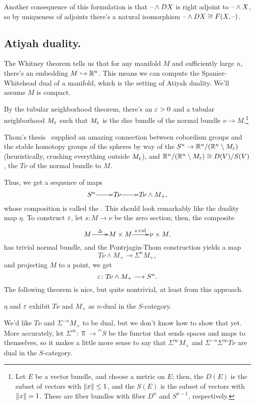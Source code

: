 Another consequence of this formulation is that $\text{--}\wedge DX$ is right adjoint to $\text{--}\wedge X$, so by uniqueness
of adjoints there's a natural isomorphism $\text{--}\wedge DX\cong F(X,\text{--})$.
\subsection*{Atiyah duality.}
The Whitney theorem tells us that for any manifold $M$ and sufficiently large $n$, there's an embedding
$M\hookrightarrow\mathbb R^n$. This means we can compute the Spanier-Whitehead dual of a manifold, which is the setting of Atiyah
duality. We'll assume $M$ is compact.

By the tubular neighborhood theorem, there's an $\varepsilon > 0$ and a tubular neighborhood $M_\varepsilon$ such that $M_\varepsilon$ is the
disc bundle of the normal bundle $\nu\to M$.\footnote{Let $E$ be a vector bundle, and choose a metric on $E$; then,
the  $D(E)$ is the subset of vectors with $\lVert x\rVert\le 1$, and the  $S(E)$ is
the subset of vectors with $\lVert x\rVert = 1$. These are fiber bundles with fiber $D^n$ and $S^{n-1}$, respectively.}

Thom's thesis~\cite{ThomThesis} supplied an amazing connection between cobordism groups and the stable homotopy
groups of the spheres by way of the  $S^n\to \mathbb R^n/(\mathbb R^n\setminus M_\varepsilon)$ (heuristically,
crushing everything outside $M_\varepsilon$), and $\mathbb R^n/(\mathbb R^n\setminus M_\varepsilon)\cong D(V)/S(V)$, the  $T\!\nu$
of the normal bundle to $M$.

Thus, we get a sequence of maps
\[\xymatrix@1{
	S^n\ar[r] & T\!\nu\ar[r] & T\!\nu\wedge M_+,
}\]
whose composition is called the . This should look remarkably like the duality map $\eta$. To
construct $\varepsilon$, let $s\colon M\to\nu$ be the zero section; then, the composite
\[\xymatrix@1{
	M\ar[r]^-\Delta & M\times M\ar[r]^{s\times\id} &\nu\times M.
}\]
has trivial normal bundle, and the Pontrjagin-Thom construction yields a map
\[T\!\nu\wedge M_+\longrightarrow\Sigma^n M_+,\]
and projecting $M$ to a point, we get
\[\varepsilon\colon T\!\nu\wedge M_+\longrightarrow S^n.\]
The following theorem is nice, but quite nontrivial, at least from this approach.
\begin{thm}
\label{atiyah_duality}
$\eta$ and $\varepsilon$ exhibit $T\!\nu$ and $M_+$ as $n$-dual in the $S$-category.
\end{thm}
We'd like $T\!\nu$ and $\Sigma^{-n}M_+$ to be dual, but we don't know how to show that yet. More accurately, let
$\Sigma^\infty\colon\Top\to\cat S$ be the functor that sends spaces and maps to themselves, so it makes a little
more sense to say that $\Sigma^\infty M_+$ and $\Sigma^{-n}\Sigma^\infty T\!\nu$ are dual in the $S$-category.

